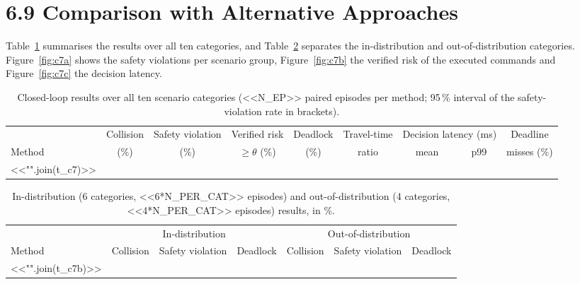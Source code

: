 \documentclass[11pt]{article}
\begin{document}
\section*{6.9 \quad Comparison with Alternative Approaches}
Table~\ref{tab:c7} summarises the results over all ten categories, and Table~\ref{tab:c7b} separates the in-distribution and
out-of-distribution categories. Figure~\ref{fig:c7a} shows the safety violations per scenario group, Figure~\ref{fig:c7b} the verified
risk of the executed commands and Figure~\ref{fig:c7c} the decision latency.

\begin{table}[h]
\centering\small
\caption{Closed-loop results over all ten scenario categories (<<N_EP>> paired episodes per method; 95\,\% interval of the
safety-violation rate in brackets).}\label{tab:c7}
\begin{adjustbox}{max width=\linewidth}
\begin{tabular}{lcccccccc}
\toprule
 & Collision & Safety violation & Verified risk & Deadlock & Travel-time & \multicolumn{2}{c}{Decision latency (ms)} & Deadline \\
Method & (\%) & (\%) & $\ge\theta$ (\%) & (\%) & ratio & mean & p99 & misses (\%) \\
\midrule
<<"\n".join(t_c7)>>
\bottomrule
\end{tabular}
\end{adjustbox}
\end{table}

\begin{table}[h]
\centering\small
\caption{In-distribution (6 categories, <<6*N_PER_CAT>> episodes) and out-of-distribution (4 categories, <<4*N_PER_CAT>> episodes) results, in \%.}\label{tab:c7b}
\begin{tabular}{lcccccc}
\toprule
 & \multicolumn{3}{c}{In-distribution} & \multicolumn{3}{c}{Out-of-distribution} \\
\cmidrule(lr){2-4}\cmidrule(lr){5-7}
Method & Collision & Safety violation & Deadlock & Collision & Safety violation & Deadlock \\
\midrule
<<"\n".join(t_c7b)>>
\bottomrule
\end{tabular}
\end{table}
\end{document}
